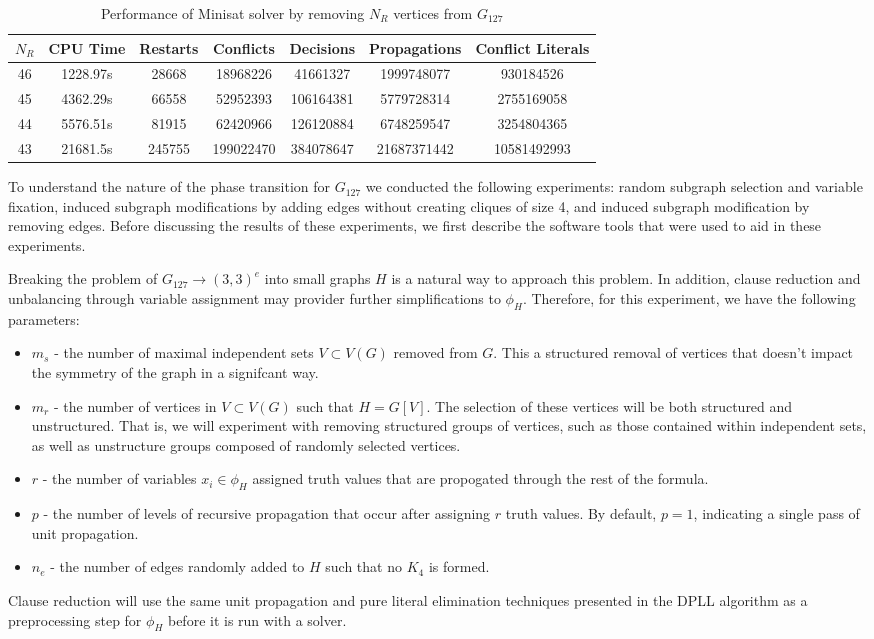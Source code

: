 \documentclass[paper=a4, fontsize=11pt]{scrartcl} %
\begin{document}
\begin{table}
	\caption{Performance of Minisat solver by removing $N_R$ vertices from $G_{127}$}
	\begin{tabular}{c | c | c | c | c | c | c}
		\hline
		$N_R$ & CPU Time & Restarts & Conflicts & Decisions & Propagations & Conflict Literals \\ \hline
		46 & 1228.97s & 28668 & 18968226 & 41661327 & 1999748077 & 930184526 \\ 
		45 & 4362.29s & 66558 & 52952393 & 106164381 & 5779728314 & 2755169058 \\ 
		44 & 5576.51s & 81915 & 62420966 & 126120884 & 6748259547 & 3254804365 \\ 
		43 & 21681.5s & 245755 & 199022470 & 384078647 & 21687371442 & 10581492993 \\ 
		\hline
	\end{tabular}
	\label{tab:performanceSat}
\end{table}

To understand the nature of the phase transition for $G_{127}$ we conducted the following
experiments: random subgraph selection and variable fixation, induced subgraph modifications
by adding edges without creating cliques of size 4, and induced subgraph modification
by removing edges. Before discussing the results of these experiments, we first describe
the software tools that were used to aid in these experiments.

Breaking the problem of $G_{127} \to (3,3)^e$ into small graphs $H$ is a natural way
to approach this problem. In addition, clause reduction and unbalancing through
variable assignment may provider further simplifications to $\phi_H$.
Therefore, for this experiment, we have the following parameters:
\begin{itemize}
	\item $m_s$ - the number of maximal independent sets $V \subset V(G)$ removed from $G$. This a structured removal of vertices that doesn't impact the symmetry of the graph in a signifcant way.
	\item $m_r$ - the number of vertices in $V \subset V(G)$ such that $H = G[V]$. The selection of
	these vertices will be both structured and unstructured. That is, we will experiment
	with removing structured groups of vertices, such as those contained within independent 
	sets, as well as unstructure groups composed of randomly selected vertices.
	\item $r$ - the number of variables $x_i \in \phi_H$ assigned truth values that are
	propogated through the rest of the formula. 
	\item $p$ - the number of levels of recursive propagation that occur after assigning 
	$r$ truth values. By default, $p = 1$, indicating a single pass of unit propagation.
	\item $n_e$ - the number of edges randomly added to $H$ such that no $K_4$ is formed. 
\end{itemize}
Clause reduction will use the same unit propagation and pure literal elimination techniques
presented in the DPLL algorithm as a preprocessing step for $\phi_H$ before it is run with a solver.
\end{document}
